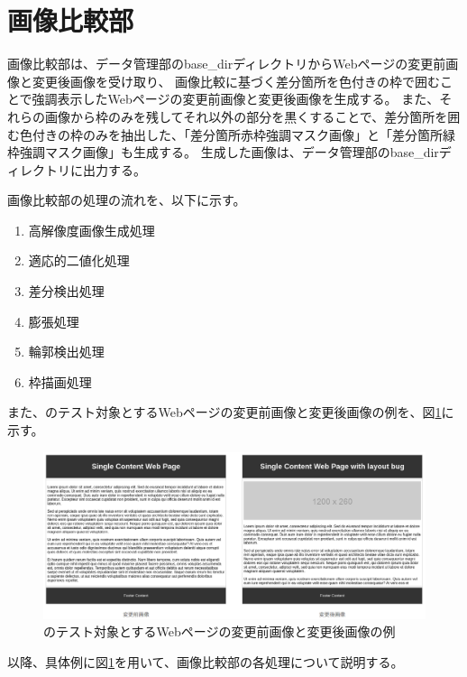 \section{画像比較部}\label{sec:Difference_extraction_section}
画像比較部は、データ管理部のbase\_dirディレクトリからWebページの変更前画像と変更後画像を受け取り、
画像比較に基づく差分箇所を色付きの枠で囲むことで強調表示したWebページの変更前画像と変更後画像を生成する。
また、それらの画像から枠のみを残してそれ以外の部分を黒くすることで、差分箇所を囲む色付きの枠のみを抽出した、「差分箇所赤枠強調マスク画像」と「差分箇所緑枠強調マスク画像」も生成する。
生成した画像は、データ管理部のbase\_dirディレクトリに出力する。
\par
画像比較部の処理の流れを、以下に示す。
\begin{enumerate}
    \item 高解像度画像生成処理
    \item 適応的二値化処理
    \item 差分検出処理
    \item 膨張処理
    \item 輪郭検出処理
    \item 枠描画処理
\end{enumerate}
また、\toolName のテスト対象とするWebページの変更前画像と変更後画像の例を、図\ref{fig: img_original_bf_af}に示す。
\begin{figure}[tp]
    \begin{center}
        \includegraphics[width=1.0\columnwidth]{image/4_img_original_bf_af.png}
        \caption{\toolName のテスト対象とするWebページの変更前画像と変更後画像の例}
        \label{fig: img_original_bf_af}
    \end{center}
\end{figure}
以降、具体例に図\ref{fig: img_original_bf_af}を用いて、画像比較部の各処理について説明する。

